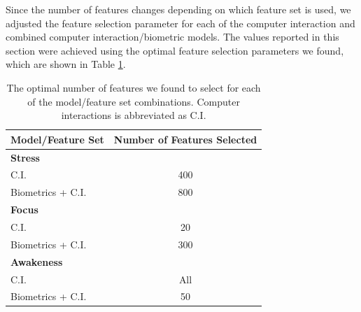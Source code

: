 Since the number of features changes  depending on which feature set is used, we adjusted the feature selection parameter for each of the computer interaction and combined computer interaction/biometric models. The values reported in this section were achieved using the optimal feature selection parameters we found, which are shown in Table \ref{ciFeatureSelection}.

\begin{table}
\begin{center}
\begin{tabular}{lc}
\hline
Model/Feature Set & Number of Features Selected\\
\hline
\textbf{Stress}\\
\hspace{3mm}C.I. & 400\\
\hspace{3mm}Biometrics + C.I. & 800\\
\hline
\textbf{Focus}\\
\hspace{3mm}C.I. & 20\\
\hspace{3mm}Biometrics + C.I. & 300\\
\hline
\textbf{Awakeness}\\
\hspace{3mm}C.I. & All\\
\hspace{3mm}Biometrics + C.I. & 50\\
\hline

\end{tabular}
\caption{The optimal number of features we found to select for each of the model/feature set combinations. Computer interactions is abbreviated as C.I.}
\label{ciFeatureSelection}
\end{center}
\vspace*{-7mm}
\end{table}


